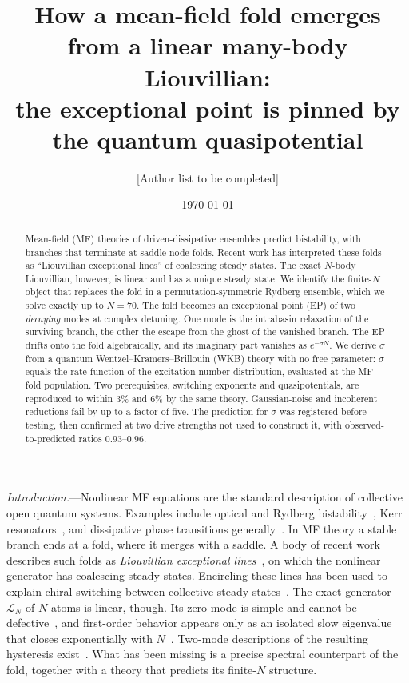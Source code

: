 \documentclass[aps,prl,twocolumn,superscriptaddress,amsmath,amssymb,reprint]{revtex4-2}
\newcommand{\Lc}{\mathcal{L}}
\begin{document}
\title{How a mean-field fold emerges from a linear many-body Liouvillian:\\
the exceptional point is pinned by the quantum quasipotential}

\author{[Author list to be completed]}
\date{\today}

\begin{abstract}
Mean-field (MF) theories of driven-dissipative ensembles predict bistability, with branches that terminate at saddle-node folds. Recent work has interpreted these folds as ``Liouvillian exceptional lines'' of coalescing steady states. The exact $N$-body Liouvillian, however, is linear and has a unique steady state. We identify the finite-$N$ object that replaces the fold in a permutation-symmetric Rydberg ensemble, which we solve exactly up to $N=70$. The fold becomes an exceptional point (EP) of two \emph{decaying} modes at complex detuning. One mode is the intrabasin relaxation of the surviving branch, the other the escape from the ghost of the vanished branch. The EP drifts onto the fold algebraically, and its imaginary part vanishes as $e^{-\sigma N}$. We derive $\sigma$ from a quantum Wentzel–Kramers–Brillouin (WKB) theory with no free parameter: $\sigma$ equals the rate function of the excitation-number distribution, evaluated at the MF fold population. Two prerequisites, switching exponents and quasipotentials, are reproduced to within $3\%$ and $6\%$ by the same theory. Gaussian-noise and incoherent reductions fail by up to a factor of five. The prediction for $\sigma$ was registered before testing, then confirmed at two drive strengths not used to construct it, with observed-to-predicted ratios $0.93$–$0.96$.
\end{abstract}

\maketitle

\emph{Introduction.}---Nonlinear MF equations are the standard description of collective open quantum systems. Examples include optical and Rydberg bistability~\cite{Carr2013,Xie2025}, Kerr resonators~\cite{Casteels2017,Minganti2018}, and dissipative phase transitions generally~\cite{Minganti2018,Macieszczak2016}. In MF theory a stable branch ends at a fold, where it merges with a saddle. A body of recent work describes such folds as \emph{Liouvillian exceptional lines}~\cite{Xie2025,SunYi2024}, on which the nonlinear generator has coalescing steady states. Encircling these lines has been used to explain chiral switching between collective steady states~\cite{Xie2025}. The exact generator $\Lc_N$ of $N$ atoms is linear, though. Its zero mode is simple and cannot be defective~\cite{HuBudich2025}, and first-order behavior appears only as an isolated slow eigenvalue that closes exponentially with $N$~\cite{Minganti2018,Casteels2017,Ptaszynski2024,Xiang2026}. Two-mode descriptions of the resulting hysteresis exist~\cite{Krimer2019}. What has been missing is a precise spectral counterpart of the fold, together with a theory that predicts its finite-$N$ structure.
\end{document}
